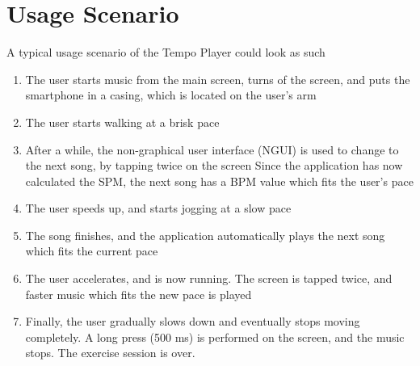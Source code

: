 \section{Usage Scenario}
A typical usage scenario of the Tempo Player could look as such

\begin{enumerate}
\item The user starts music from the main screen, turns of the screen, and puts the smartphone in a casing, which is located on the user's arm
\item The user starts walking at a brisk pace
\item After a while, the non-graphical user interface (NGUI) is used to change to the next song, by tapping twice on the screen
\subitem Since the application has now calculated the SPM, the next song has a BPM value which fits the user's pace
\item The user speeds up, and starts jogging at a slow pace
\item The song finishes, and the application automatically plays the next song which fits the current pace
\item The user accelerates, and is now running. The screen is tapped twice, and faster music which fits the new pace is played
\item Finally, the user gradually slows down and eventually stops moving completely. A long press (500 ms) is performed on the screen, and the music stops. The exercise session is over.
\end{enumerate}